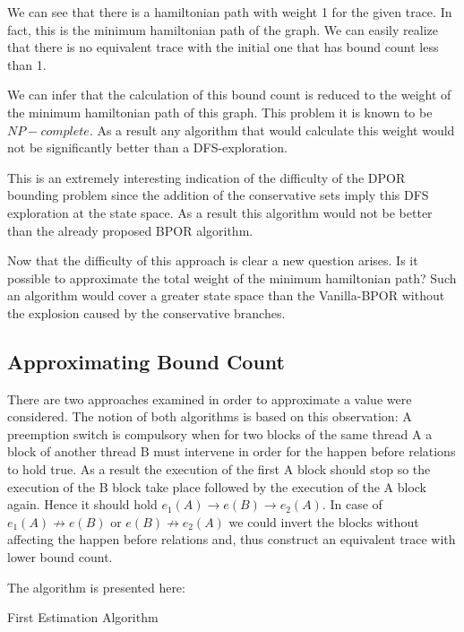 We can see that there is a hamiltonian path with weight 1 for the given trace. In fact, this is the minimum hamiltonian path of the graph. We can easily realize that 
there is no equivalent trace with the initial one that has bound count less than 1. 

We can infer that the calculation of this bound count is reduced to the weight of the minimum hamiltonian path of this graph. This problem it is known to be $NP-complete$. 
As a result any algorithm that would calculate this weight would not be significantly better than a DFS-exploration. 

This is an extremely interesting indication of the difficulty of the DPOR bounding problem since the addition of the conservative sets imply this DFS
exploration at the state space. As a result this algorithm would not be better than the already proposed BPOR algorithm.

Now that the difficulty of this approach is clear a new question arises. Is it possible to approximate the total weight of the minimum hamiltonian path?
Such an algorithm would cover a greater state space than the Vanilla-BPOR without the explosion caused by the conservative branches.

\subsection{Approximating Bound Count}
There are two approaches examined in order to approximate a value were considered. The notion of both algorithms is based on this observation: A preemption switch is compulsory
when for two blocks of the same thread A a block of another thread B must intervene in order for the happen before relations to hold true. As a result the execution of 
the first A block should stop so the execution of the B block take place followed by the execution of the A block again. Hence it should hold $e_1(A) \rightarrow e(B) \rightarrow e_2(A)$.
In case of $e_1(A) \not \rightarrow e(B)$ or $e(B) \not \rightarrow e_2(A)$ we could invert the blocks without affecting the happen before relations and, thus construct an
equivalent trace with lower bound count.

The algorithm is presented here:\\

\begin{algorithm}[H]
    \caption{First Estimation Algorithm}
\end{algorithm}

